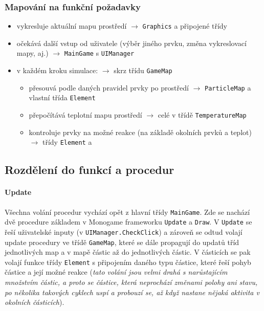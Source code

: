 \documentclass[a4paper, 12pt]{article}
\begin{document}
\newpage
\subsubsection{Mapování na funkční požadavky}
\begin{itemize}
    \item vykresluje aktuální mapu prostředí \(\rightarrow\) \texttt{Graphics} a připojené
        třídy
    \item očekává další vstup od uživatele (výběr jiného prvku, změna
        vykreslovací mapy, aj.) \(\rightarrow\) \texttt{MainGame} s \texttt{UIManager}
    \item v každém kroku simulace: \(\rightarrow\) skrz třídu \texttt{GameMap}
        \begin{itemize}
            \item přesouvá podle daných pravidel prvky po prostředí \(\rightarrow\)
                \texttt{ParticleMap} a vlastní třída \texttt{Element}
            \item přepočítává teplotní mapu prostředí \(\rightarrow\) celé v třídě
                \texttt{TemperatureMap}
            \item kontroluje prvky na možné reakce (na základě okolních prvků a
                teplot) \(\rightarrow\) třídy \texttt{Element} a \texttt{}
        \end{itemize}
\end{itemize}

\subsection{Rozdělení do funkcí a procedur}
\paragraph{Update}
Všechna volání procedur vychází opět z hlavní třídy \texttt{MainGame}.
Zde se nachází dvě procedure základem v Monogame frameworku \texttt{Update} a
\texttt{Draw}. V \texttt{Update} se řeší uživatelské inputy (v
\texttt{UIManager.CheckClick}) a zároveň se odtud volají update procedury ve třídě
\texttt{GameMap}, které se dále propagují do updatů tříd jednotlivých map a v
mapě částic až do jednotlivých částic. V částicích se pak volají funkce třídy
\texttt{Element} s připojením daného typu částice, které řeší pohyb částice a
její možné reakce (\emph{tato volání jsou velmi drahá s narůstajícím množstvím
    částic, a proto se částice, která neprochází změnami polohy ani stavu, po 
    několika takových cyklech uspí a probouzí se, až když nastane nějaká aktivita v okolních částicích}).
\end{document}
